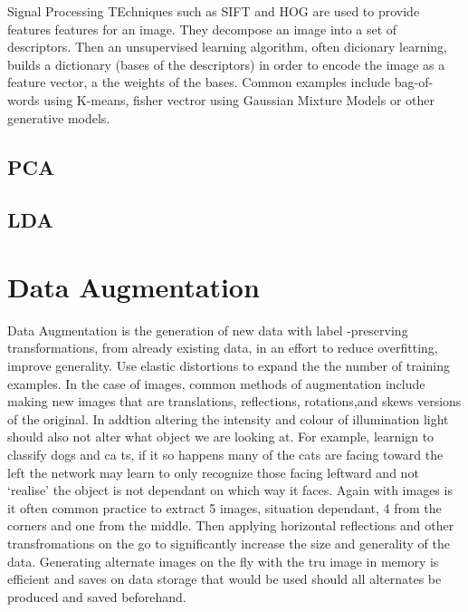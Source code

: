Signal Processing TEchniques such as SIFT\citep{lowe2004distinctive} and HOG\citep{dalal2005histograms} are used to provide features features  for an image.
They decompose an image into a set of descriptors.
Then an unsupervised learning algorithm, often dicionary learning, builds a dictionary (bases of the descriptors) in order to encode the image as a feature vector, a the weights of the bases\citep{yang2015deep}.
Common examples include bag-of-words using K-means\citep{sivic2003video}, fisher vectror using Gaussian Mixture Models\citep{perronnin2010improving} or other generative models.

        \subsection{PCA}
        
        
        \subsection{LDA}



    \section{Data Augmentation}
    
    
    
    
    
Data Augmentation is the generation of new data with label -preserving transformations, from already existing data, in an effort to reduce overfitting, improve generality\citep{goyal2014object}\citep{krizhevsky2012imagenet}.
Use elastic distortions to expand the the number of training examples\citep{mo2012survey}.
In the case of images, common methods of augmentation include making new images that are translations, reflections, rotations,and skews versions of the original.
In addtion altering the intensity and colour of illumination light should also not alter what object we are looking at\citep{chatfield2014return}.
For example, learnign to classify dogs and ca ts, if it so happens many of the cats are facing toward the left the network may learn to only recognize those facing leftward and not `realise' the object is not dependant on which way it faces.
Again with images is it often common practice to extract 5 images, situation dependant, 4 from the corners and one from the middle\citep{chatfield2014return}.
Then applying horizontal reflections and other transfromations on the go to significantly increase the size and generality of the data.
Generating alternate images on the fly with the tru image in memory is efficient and saves on data storage that would be used should all alternates be produced and saved beforehand\citep{goyal2014object}.

